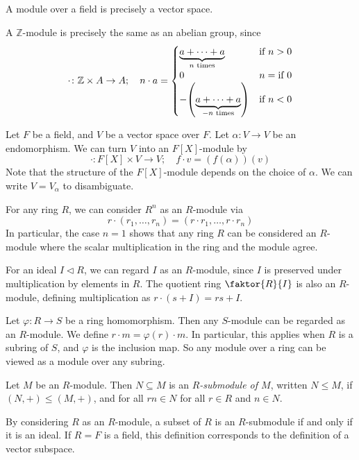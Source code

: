 \begin{example}
	A module over a field is precisely a vector space.

	A \( \mathbb Z \)-module is precisely the same as an abelian group, since
	\[ \cdot \colon \mathbb Z \times A \to A;\quad n \cdot a = \begin{cases}
		\underbrace{a + \dots + a}_{n \text{ times}} & \text{if } n > 0 \\
		0 & n = \text{if } 0 \\
		-\qty(\underbrace{a + \dots + a}_{-n \text{ times}}) & \text{if } n < 0
	\end{cases} \]

	Let \( F \) be a field, and \( V \) be a vector space over \( F \).
	Let \( \alpha \colon V \to V \) be an endomorphism.
	We can turn \( V \) into an \( F[X] \)-module by
	\[ \cdot \colon F[X] \times V \to V;\quad f \cdot v = (f(\alpha))(v) \]
	Note that the structure of the \( F[X] \)-module depends on the choice of \( \alpha \).
	We can write \( V = V_\alpha \) to disambiguate.

	For any ring \( R \), we can consider \( R^n \) as an \( R \)-module via
	\[ r \cdot (r_1, \dots, r_n) = (r \cdot r_1, \dots, r \cdot r_n) \]
	In particular, the case \( n = 1 \) shows that any ring \( R \) can be considered an \( R \)-module where the scalar multiplication in the ring and the module agree.

	For an ideal \( I \triangleleft R \), we can regard \( I \) as an \( R \)-module, since \( I \) is preserved under multiplication by elements in \( R \).
	The quotient ring \( \faktor{R}{I} \) is also an \( R \)-module, defining multiplication as \( r \cdot (s+I) = rs + I \).

	Let \( \varphi \colon R \to S \) be a ring homomorphism.
	Then any \( S \)-module can be regarded as an \( R \)-module.
	We define \( r \cdot m = \varphi(r) \cdot m \).
	In particular, this applies when \( R \) is a subring of \( S \), and \( \varphi \) is the inclusion map.
	So any module over a ring can be viewed as a module over any subring.
\end{example}
\begin{definition}
	Let \( M \) be an \( R \)-module.
	Then \( N \subseteq M \) is an \textit{\( R \)-submodule of \( M \)}, written \( N \leq M \), if \( (N, +) \leq (M, +) \), and for all \( rn \in N \) for all \( r \in R \) and \( n \in N \).
\end{definition}
\begin{example}
	By considering \( R \) as an \( R \)-module, a subset of \( R \) is an \( R \)-submodule if and only if it is an ideal.
	If \( R = F \) is a field, this definition corresponds to the definition of a vector subspace.
\end{example}
